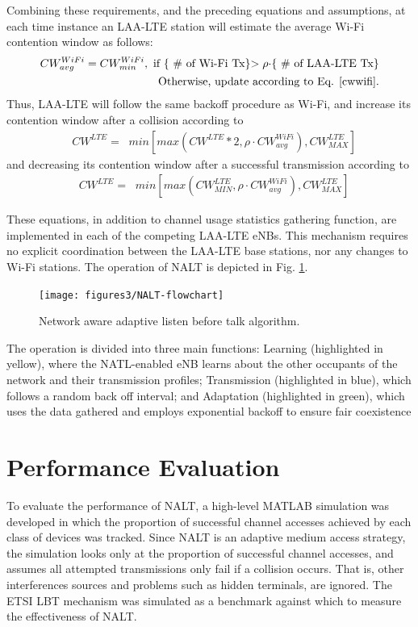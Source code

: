 Combining these requirements, and the preceding equations and assumptions, at each time instance an \mbox{LAA-LTE} station will estimate the average \mbox{Wi-Fi} contention window as follows:
\begin{align}
CW^{WiFi}_{avg} = CW^{WiFi}_{min}, \text{  if \{ \# of \mbox{Wi-Fi} Tx\}$> \rho\cdot$\{  \# of \mbox{LAA-LTE} Tx\}}\notag\\ 
\text{Otherwise, update according to Eq. \ref{cwwifi}.}
\end{align}
Thus, \mbox{LAA-LTE} will follow the same backoff procedure as \mbox{Wi-Fi}, and increase its contention window after a collision according to
\begin{align}
&CW^{LTE}=\;\;min\left[max\left(CW^{LTE}*2,\rho \cdot CW^{WiFi}_{avg}\right), CW^{LTE}_{MAX}\right]
\end{align}
and decreasing its contention window after a successful transmission according to 
\begin{align}
&CW^{LTE}=\;\;min\left[max\left(CW^{LTE}_{MIN},\rho \cdot CW^{WiFi}_{avg}\right), CW^{LTE}_{MAX}\right]
\end{align}

These equations, in addition to channel usage statistics gathering function, are implemented in each of the competing LAA-LTE eNBs.  This mechanism requires no explicit coordination between the LAA-LTE base stations, nor any changes to Wi-Fi stations. The operation of NALT is depicted in Fig. \ref{NALT-flowchart}. 
\begin{figure}[!ht]
	\centering
	\texttt{[image: figures3/NALT-flowchart]}
	\caption{Network aware adaptive listen before talk algorithm.}
	\label{NALT-flowchart}
\end{figure}
The operation is divided into three main functions: Learning (highlighted in yellow), where the NATL-enabled eNB learns about the other occupants of the network and their transmission profiles; Transmission (highlighted in blue), which follows a random back off interval; and Adaptation (highlighted in green), which uses the data gathered and employs exponential backoff to ensure fair coexistence


\section{Performance Evaluation}\label{perf-eval}
To evaluate the performance of NALT, a high-level MATLAB simulation was developed in which the proportion of successful channel accesses achieved by each class of devices was tracked. Since NALT is an adaptive medium access strategy, the simulation looks only at the proportion of successful channel accesses, and assumes all attempted transmissions only fail if a collision occurs.  That is, other interferences sources and problems such as hidden terminals, are ignored.  The ETSI LBT mechanism was simulated as a benchmark against which to measure the effectiveness of NALT.


